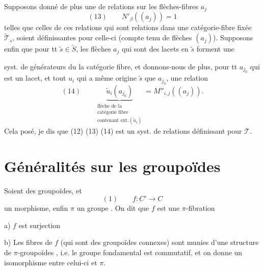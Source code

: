\documentclass[11pt,a4paper]{article}
\begin{document}
Supposons donné de plus une \struck{\ill{}}  de relations sur les flèches-fibres
$a_j$
\[
  (13) \qquad \boxed{N'_\beta((a_j)) = 1}
\]
telles que celles de ces relations qui sont relations dans une catégorie-fibre fixée
$\widetilde{\mathcal{T}}_s$, soient définissantes pour celle-ci 
(compte tenu \struck{\ill{}} de flèches \struck{\ill{}} $(a_j)$).  Supposons
enfin que pour tt $\tilde{s} \in \widetilde{S}$, les  flèches $a_j$ qui sont
des lacets en $\tilde{s}$ forment une

syst. de générateurs du  la catégorie fibre, et donnons-nous de plus, pour tt
$a_{j_0}$ qui est un lacet, et tout $u_i$ qui a même origine $\tilde{s}$ que $a_{j_0}$, une
relation
\[
  (14) \qquad
  \boxed{\underbrace{\tilde{u}_i(a_{j_0})}_{\substack{\text{flèche de la}\\ \text{catégorie fibre}\\ \text{contenant ext.}(\tilde{u}_i)}}
  = M''_{i,j}((a_j))} .
\]
Cela \struck{\ill{}} posé, je dis que (12) (13) (14) est un syst. de relations définissant
pour $\mathcal{T}$.

\section{Généralités sur les groupoïdes}

Soient \struck{\ill{}}  des groupoïdes, et
\[
  (1) \qquad f : C' \longrightarrow C
\]
un morphisme, enfin $\pi$ un groupe  . On dit que $f$ est une  $\pi$-fibration 

a) $f$ est  surjection 
 \ill{}

b) Les fibres de $f$ (qui sont des groupoïdes connexes) sont munies d'une structure de
$\pi$-groupoïdes  \ill{}, i.e. le groupe fondamental est commutatif, et on
donne un isomorphisme entre celui-ci et $\pi$.
\end{document}
